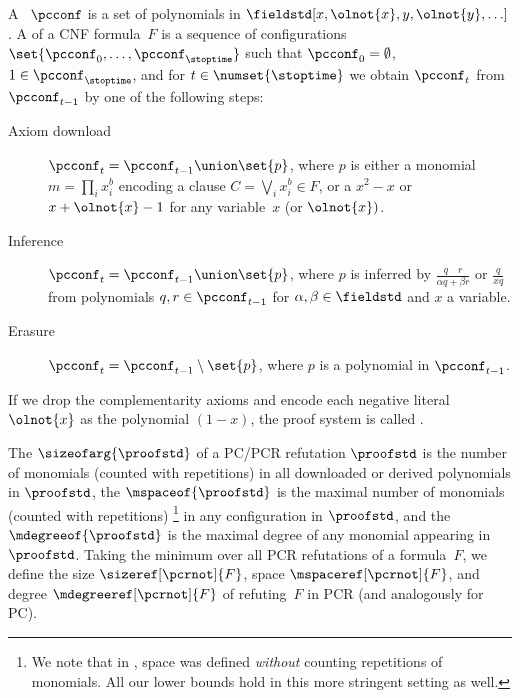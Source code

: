 \begin{definition}
  \label{def:sequential-refutation}
  A ~$\pcconf$ is a set of
%
  polynomials 
  in
%
  $\fieldstd[x, \olnot{x}, y, \olnot{y}, \ldots]$.
  A 
   of a CNF formula~$F$
  is a
  sequence of configurations $\set{\pcconf_0, \ldots,
    \pcconf_\stoptime}$ such that $\pcconf_0 = \emptyset$, $1 \in
  \pcconf_{\stoptime}$, and
  for $t \in \numset{\stoptime}$
  we obtain
  $\pcconf_t$
  from $\pcconf_{t-1}$ by one of the following steps:
  \begin{description}
  \item[Axiom download] $\pcconf_t = \pcconf_{t-1} \union \set{p}$,
    where $p$ is either 
    a %
    monomial 
    $m = \prod_i x_i^b$
    encoding 
    a %
    clause
    $C=\bigvee_i x_i^b \in F$,
    or
    a  $x^2 - x$ 
    or
     $x + \olnot{x} - 1$
    for any variable~$x$ (or $\olnot{x})$.
  \item[Inference] $\pcconf_t = \pcconf_{t - 1} \union \set{p}$, where
    $p$ is 
%
%
%
%
%
%
%
%
%
    inferred by 
     $\frac{q \quad r}{\alpha q + \beta r}$
    or
     $\frac{q}{x q}$
    from  polynomials $q, r \in \pcconf_{t - 1}$ 
    for $\alpha, \beta \in \fieldstd$ and $x$ a variable.
  \item[Erasure] $\pcconf_t = \pcconf_{t - 1} \setminus \set{p}$,
    where $p$ is a polynomial in $\pcconf_{t - 1}$.
  \end{description}
  If we drop
  the  %
  complementarity axioms and encode each negative literal
  $\olnot{x}$ as the polynomial $(1 - x)$, the proof system is called
  . 

  The  $\sizeofarg{\proofstd}$ of a
  PC/PCR refutation $\proofstd$ is the number of monomials (counted
  with repetitions) in all downloaded or derived polynomials in
  $\proofstd$, the 
  $\mspaceof{\proofstd}$ is the maximal number of monomials (counted
  with repetitions)%
  \footnote{%
    We note that in
      \cite{ABRW02SpaceComplexity},
      space was defined \emph{without} counting repetitions of monomials. 
      All our lower bounds hold in this more stringent setting as well.}
  in any configuration in $\proofstd$, and the
   $\mdegreeof{\proofstd}$ is the maximal degree
  of any monomial appearing in $\proofstd$.  Taking the minimum over
  all PCR refutations of a formula~$F$, we define the size
  $\sizeref[\pcrnot]{F}$, space $\mspaceref[\pcrnot]{F}$, and degree
  $\mdegreeref[\pcrnot]{F}$ of refuting~$F$ in PCR
  (and analogously for PC).
\end{definition}

